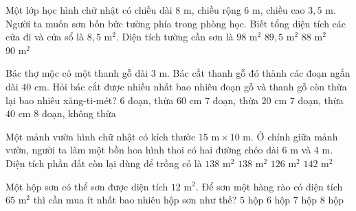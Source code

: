 \begin{ex} %
Một lớp học hình chữ nhật có chiều dài $8\text{ m}$, chiều rộng $6\text{ m}$, chiều cao $3{,}5\text{ m}$. Người ta muốn sơn bốn bức tường phía trong phòng học. Biết tổng diện tích các cửa đi và cửa sổ là $8{,}5\text{ m}^2$. Diện tích tường cần sơn là
\choice
{$98\text{ m}^2$}
{\True $89{,}5\text{ m}^2$}
{$88\text{ m}^2$}
{$90\text{ m}^2$}
\end{ex}

\begin{ex} %
Bác thợ mộc có một thanh gỗ dài $3\text{ m}$. Bác cắt thanh gỗ đó thành các đoạn ngắn dài $40\text{ cm}$. Hỏi bác cắt được nhiều nhất bao nhiêu đoạn gỗ và thanh gỗ còn thừa lại bao nhiêu xăng-ti-mét?
\choice
{$6$ đoạn, thừa $60\text{ cm}$}
{\True $7$ đoạn, thừa $20\text{ cm}$}
{$7$ đoạn, thừa $40\text{ cm}$}
{$8$ đoạn, không thừa}
\end{ex}

\begin{ex} %
Một mảnh vườn hình chữ nhật có kích thước $15\text{ m} \times 10\text{ m}$. Ở chính giữa mảnh vườn, người ta làm một bồn hoa hình thoi có hai đường chéo dài $6\text{ m}$ và $4\text{ m}$. Diện tích phần đất còn lại dùng để trồng cỏ là
\choice
{$138\text{ m}^2$}
{\True $138\text{ m}^2$}
{$126\text{ m}^2$}
{$142\text{ m}^2$}
\end{ex}

\begin{ex} %
Một hộp sơn có thể sơn được diện tích $12\text{ m}^2$. Để sơn một hàng rào có diện tích $65\text{ m}^2$ thì cần mua ít nhất bao nhiêu hộp sơn như thế?
\choice
{$5$ hộp}
{\True $6$ hộp}
{$7$ hộp}
{$8$ hộp}
\end{ex}

